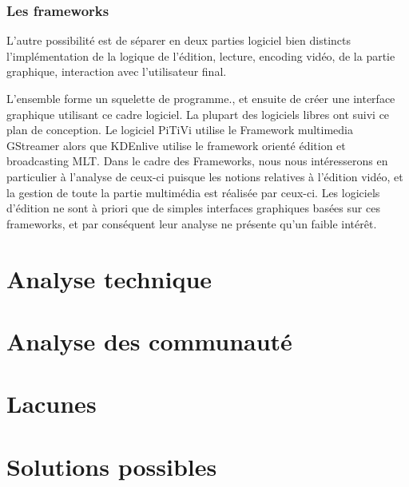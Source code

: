 \subsubsection {Les frameworks }

L'autre possibilité est de séparer en deux parties logiciel bien distincts
l'implémentation de la logique de l'édition, lecture, encoding vidéo, de la
partie graphique, interaction avec l'utilisateur final.

L'ensemble forme un
squelette de programme., et ensuite de créer une interface graphique
utilisant ce cadre logiciel. La plupart des logiciels libres ont suivi ce
plan de conception. Le logiciel PiTiVi utilise le Framework multimedia
GStreamer alors que KDEnlive utilise le framework orienté édition et
broadcasting MLT. Dans le cadre des Frameworks, nous nous intéresserons
en particulier à l'analyse de ceux-ci puisque les notions relatives
à l'édition vidéo, et la gestion de toute la partie multimédia est
réalisée par ceux-ci. Les logiciels d'édition ne sont à priori que
de simples interfaces graphiques basées sur ces frameworks, et par
conséquent leur analyse ne présente qu'un faible intérêt.


\section{Analyse technique}

\section{Analyse des communauté}

\section{Lacunes}

\section{Solutions possibles}
